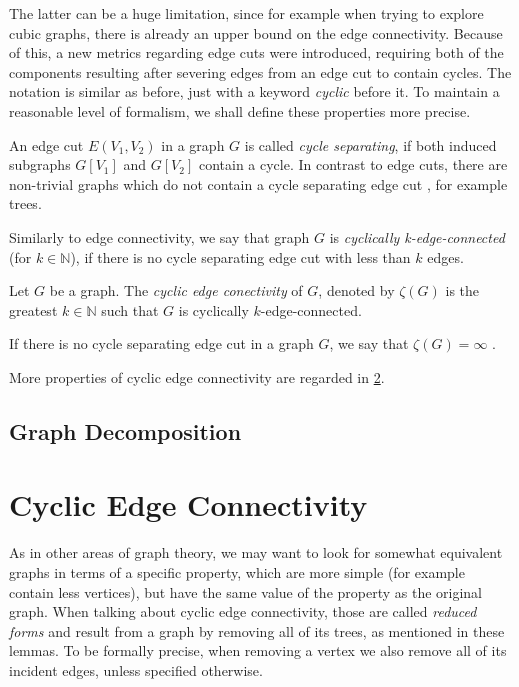 \documentclass[12pt, twoside]{book}
\begin{document}
The latter can be a huge limitation, since for example when trying to explore cubic graphs, there is already an upper bound on the edge connectivity. Because of this, a new metrics regarding edge cuts were introduced, requiring both of the components resulting after severing edges from an edge cut to contain cycles. The notation is similar as before, just with a keyword \textit{cyclic} before it. To maintain a reasonable level of formalism, we shall define these properties more precise.

An edge cut $E(V_1,V_2)$ in a graph $G$ is called \textit{cycle separating}, if both induced subgraphs $G[V_1]$ and $G[V_2]$ contain a cycle. In contrast to edge cuts, there are non-trivial graphs which do not contain a cycle separating edge cut \cite{atoms-of-cyclic, Lou2008, lovasz1965graphs}, for example trees. 

Similarly to edge connectivity, we say that graph $G$ is \textit{cyclically k-edge-connected} (for $k\in\mathbb{N}$), if there is no cycle separating edge cut with less than $k$ edges.

\begin{definition}
	Let $G$ be a graph. The \textit{cyclic edge conectivity} of $G$, denoted by $\zeta(G)$ is the greatest $k\in\mathbb{N}$ such that $G$ is cyclically $k$-edge-connected.
\end{definition}

If there is no cycle separating edge cut in a graph $G$, we say that $\zeta(G)=\infty$ \cite{Lou2008}.

More properties of cyclic edge connectivity are regarded in \cref{ch:cyclic-edge-connectivity}.

\section{Graph Decomposition}\label{sec:graph-decomposition}

\chapter{Cyclic Edge Connectivity}\label{ch:cyclic-edge-connectivity}


As in other areas of graph theory, we may want to look for somewhat equivalent graphs in terms of a specific property, which are more simple (for example contain less vertices), but have the same value of the property as the original graph. When talking about cyclic edge connectivity, those are called \textit{reduced forms} and result from a graph by removing all of its trees, as mentioned in these lemmas. To be formally precise, when removing a vertex we also remove all of its incident edges, unless specified otherwise.
\end{document}
